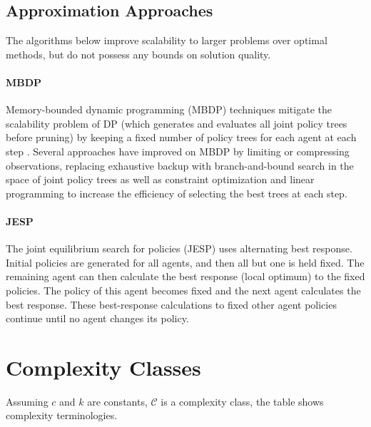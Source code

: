 \documentclass{article} %
\begin{document}
\subsection{Approximation Approaches}

The algorithms below improve scalability to larger problems over optimal methods, but do not possess any bounds on solution quality.

\paragraph{MBDP} Memory-bounded dynamic programming (MBDP) techniques mitigate the scalability problem of DP (which generates and evaluates all joint policy trees before pruning) by keeping a fixed number of policy trees for each agent at each step \cite{Seuken2007}. Several approaches have improved on MBDP by limiting \cite{Seukenimproved2007} or compressing \cite{Carlin2008} observations, replacing exhaustive backup with branch-and-bound search in the space of joint policy trees \cite{Dibangoye2009} as well as constraint optimization \cite{Kumar2010} and linear programming \cite{Wu2010} to increase the efficiency of selecting the best trees at each step.

\paragraph{JESP} The joint equilibrium search for policies (JESP) \cite{nair2003taming} uses alternating best response. Initial policies are generated for all agents, and then all but one is held fixed. The remaining agent can then calculate the best response (local optimum) to the fixed policies. The policy of this agent becomes fixed and the next agent calculates the best response. These best-response calculations to fixed other agent policies continue until no agent changes its policy.




\clearpage
\appendix

\section{Complexity Classes} \label{appendix:complex}

Assuming $c$ and $k$ are constants, $\mathcal{C}$ is a complexity class, the table shows complexity terminologies.
\end{document}
